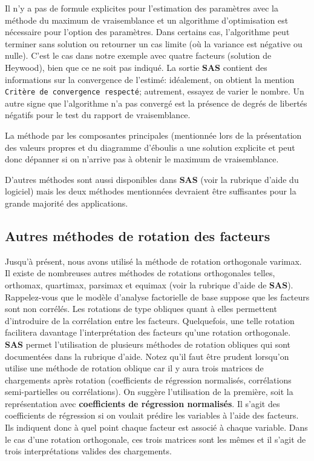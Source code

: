 \documentclass[
  11pt,
  letterpaper,
]{book}
\theoremstyle{definition}
\theoremstyle{definition}
\theoremstyle{definition}
\theoremstyle{remark}
\begin{document}
Il n'y a pas de formule explicites pour l'estimation des paramètres avec la méthode du maximum de vraisemblance et un algorithme d'optimisation est nécessaire pour l'option des paramètres. Dans certains cas, l'algorithme peut terminer sans solution ou retourner un cas limite (où la variance est négative ou nulle). C'est le cas dans notre exemple avec quatre facteurs (solution de Heywood), bien que ce ne soit pas indiqué. La sortie \textbf{SAS} contient des informations sur la convergence de l'estimé: idéalement, on obtient la mention \texttt{Critère\ de\ convergence\ respecté}; autrement, essayez de varier le nombre. Un autre signe que l'algorithme n'a pas convergé est la présence de degrés de libertés négatifs pour le test du rapport de vraisemblance.

La méthode par les composantes principales (mentionnée lors de la présentation des valeurs propres et du diagramme d'éboulis a une solution explicite et peut donc dépanner si on n'arrive pas à obtenir le maximum de vraisemblance.

D'autres méthodes sont aussi disponibles dans \textbf{SAS} (voir la rubrique d'aide du logiciel) mais les deux méthodes mentionnées devraient être suffisantes pour la grande majorité des applications.

\hypertarget{autres-muxe9thodes-de-rotation-des-facteurs}{%
\subsection{Autres méthodes de rotation des facteurs}\label{autres-muxe9thodes-de-rotation-des-facteurs}}

Jusqu'à présent, nous avons utilisé la méthode de rotation orthogonale varimax. Il existe de nombreuses autres méthodes de rotations orthogonales telles, orthomax, quartimax, parsimax et equimax (voir la rubrique d'aide de \textbf{SAS}). Rappelez-vous que le modèle d'analyse factorielle de base suppose que les facteurs sont non corrélés. Les rotations de type obliques quant à elles permettent d'introduire de la corrélation entre les facteurs. Quelquefois, une telle rotation facilitera davantage l'interprétation des facteurs qu'une rotation orthogonale. \textbf{SAS} permet l'utilisation de plusieurs méthodes de rotation obliques qui sont documentées dans la rubrique d'aide. Notez qu'il faut être prudent lorsqu'on utilise une méthode de rotation oblique car il y aura trois matrices de chargements après rotation (coefficients de régression normalisés, corrélations semi-partielles ou corrélations). On suggère l'utilisation de la première, soit la représentation avec \textbf{coefficients de régression normalisés}. Il s'agit des coefficients de régression si on voulait prédire les variables à l'aide des facteurs. Ils indiquent donc à quel point chaque facteur est associé à chaque variable. Dans le cas d'une rotation orthogonale, ces trois matrices sont les mêmes et il s'agit de trois interprétations valides des chargements.
\end{document}
